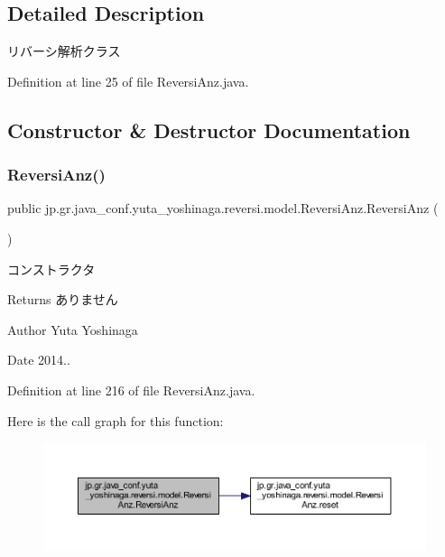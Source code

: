 \subsection{Detailed Description}
リバーシ解析クラス 

Definition at line 25 of file Reversi\+Anz.\+java.



\subsection{Constructor \& Destructor Documentation}
\mbox{\label{classjp_1_1gr_1_1java__conf_1_1yuta__yoshinaga_1_1reversi_1_1model_1_1_reversi_anz_a130d4d7b3641a385209d1596c2f3e024}} 
\subsubsection{\texorpdfstring{Reversi\+Anz()}{ReversiAnz()}}
{\footnotesize\ttfamily public jp.\+gr.\+java\+\_\+conf.\+yuta\+\_\+yoshinaga.\+reversi.\+model.\+Reversi\+Anz.\+Reversi\+Anz (\begin{DoxyParamCaption}{ }\end{DoxyParamCaption})}



コンストラクタ 

\begin{DoxyReturn}{Returns}
ありません 
\end{DoxyReturn}
\begin{DoxyAuthor}{Author}
Yuta Yoshinaga 
\end{DoxyAuthor}
\begin{DoxyDate}{Date}
2014.. 
\end{DoxyDate}


Definition at line 216 of file Reversi\+Anz.\+java.

Here is the call graph for this function\+:\nopagebreak
\begin{figure}[H]
\begin{center}
\leavevmode
\includegraphics[width=350pt]{classjp_1_1gr_1_1java__conf_1_1yuta__yoshinaga_1_1reversi_1_1model_1_1_reversi_anz_a130d4d7b3641a385209d1596c2f3e024_cgraph}
\end{center}
\end{figure}


